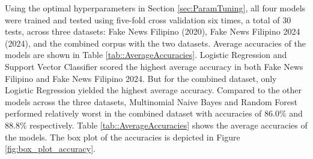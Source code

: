 Using the optimal hyperparameters in Section \ref{sec:ParamTuning}, all four models were trained and tested using five-fold cross validation six times, a total of 30 tests, across three datasets: Fake News Filipino (2020), Fake News Filipino 2024 (2024), and the combined corpus with the two datasets. Average accuracies of the models are shown in Table \ref{tab::AverageAccuracies}. Logistic Regression and Support Vector Classifier scored the highest average accuracy in both Fake News Filipino and Fake News Filipino 2024. But for the combined dataset, only Logistic Regression yielded the highest average accuracy. Compared to the other models across the three datasets, Multinomial Naive Bayes and Random Forest performed relatively worst in the combined dataset with accuracies of 86.0\% and 88.8\% respectively. Table \ref{tab::AverageAccuracies} shows the average accuracies of the models. The box plot of the accuracies is depicted in Figure \ref{fig:box_plot_accuracy}.



    


